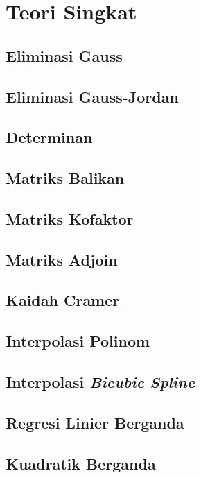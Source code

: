 \section{Teori Singkat}
\subsection{Eliminasi Gauss}
\subsection{Eliminasi Gauss-Jordan}
\subsection{Determinan} 
\subsection{Matriks Balikan}
\subsection{Matriks Kofaktor} 
\subsection{Matriks Adjoin}
\subsection{Kaidah Cramer} 
\subsection{Interpolasi Polinom}
\subsection{Interpolasi \textit{Bicubic Spline}}
\subsection{Regresi Linier Berganda}
\subsection{Kuadratik Berganda}
\pagebreak